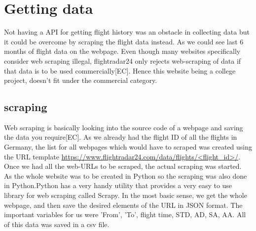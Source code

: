 \section{Getting data}
Not having a API for getting flight history was an obstacle in collecting data but it could be overcome by scraping the flight data instead. As we could see last 6 months of flight data on the webpage.
Even though many websites specifically consider web scraping illegal, flightradar24 only rejects web-scraping of data if that data is to be used commercially[EC]. Hence this website being a college project, doesn't fit under the commercial category.

\subsection{scraping}
Web scraping is basically looking into the source code of a webpage and saving the data you require[EC]. As we already had the flight ID of all the flights in Germany, the list for all webpages which would have to scraped was created using the URL template \url{https://www.flightradar24.com/data/flights/<flight_id>/}. 
Once we had all the web-URLs to be scraped, the actual scraping was started. \\As the whole website was to be created in Python so  the scraping was also done in Python.Python has a very handy utility that provides a very easy to use library for web scraping called Scrapy. 
In the most basic sense, we get the whole webpage, and then save the desired elements of the URL in JSON format. The important variables for us were 'From', 'To', flight time, STD, AD, SA, AA. All of this data was saved in a csv file.
 

